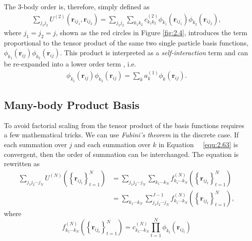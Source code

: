 The $3$-body order is, therefore, simply defined as
\begin{equation}
\label{equ:2.64}
\begin{split}
\sum_{{j}_{1}{j}_{2}}U^{(2)}(\mathbf{r}_{i{j}_{1}},\mathbf{r}_{i{j}_{2}})=
\sum_{{j}_{1}{j}_{2}}\sum_{{k}_{1}{k}_{2}}
c^{(2)}_{{k}_{1}{k}_{2}}\phi_{k_{1}}(\mathbf{r}_{i{j}_{1}})\phi_{k_{2}}(\mathbf{r}_{i{j}_{2}}),
\end{split}
\end{equation}
where $j_{1} = j_{2} = j$, shown as the red circles in Figure \ref{fig:2.4}, introduces the term proportional to the tensor product of the same two single particle basis functions, $\phi_{k_{1}}(\mathbf{r}_{ij})\phi_{k_{2}}(\mathbf{r}_{ij})$.
This product is interpreted as a \textit{self-interaction} term and can be re-expanded into a lower order term \cite{Drautz2019,Ho2024}, i.e.
\begin{equation}
\label{equ:2.65}
\begin{split}
\phi_{k_{1}}(\mathbf{r}_{ij})\phi_{k_{2}}(\mathbf{r}_{ij})=\sum_{k}
a^{(1)}_{k}\phi_{k}(\mathbf{r}_{ij}).
\end{split}
\end{equation}
\subsection{Many-body Product Basis} \label{sec:2.5.3}
To avoid factorial scaling from the tensor product of the basis functions requires a few mathematical tricks.
We can use \textit{Fubini's theorem} \cite{rudin1976principles} in the discrete case.
If each summation over $j$ and each summation over $k$ in Equation~ ~\eqref{equ:2.63} is convergent, then the order of summation can be interchanged.
The equation is rewritten as
\begin{equation}
\label{equ:2.66}
\begin{split}
\sum_{{j}_{1}{j}_{2}\cdots{j}_{N}}U^{(N)}(\left\{\mathbf{r}_{ij_{t}}\right\}_{t=1}^{N})&=
\sum_{{j}_{1}{j}_{2}\cdots{j}_{N}}
\sum_{{k}_{1}\cdots{k}_{N}}
f^{(N)}_{{k}_{1}\cdots{k}_{N}}(\left\{\mathbf{r}_{ij_{t}}\right\}_{t=1}^{N})\\
&=\sum_{{k}_{1}\cdots{k}_{N}}
\sum^{J-1}_{{j}_{1}{j}_{2}\cdots{j}_{N}}
f^{(N)}_{{k}_{1}\cdots{k}_{N}}(\left\{\mathbf{r}_{ij_{t}}\right\}_{t=1}^{N}),
\end{split}
\end{equation}
where \[f^{(N)}_{{k}_{1}\cdots{k}_{N}}(\left\{\mathbf{r}_{ij_{t}}\right\}_{t=1}^{N}) = c^{(N)}_{{k}_{1}\cdots{k}_{N}}\prod_{t=1}^{N}\phi_{k_{t}}(\mathbf{r}_{i{j}_{t}})\]

